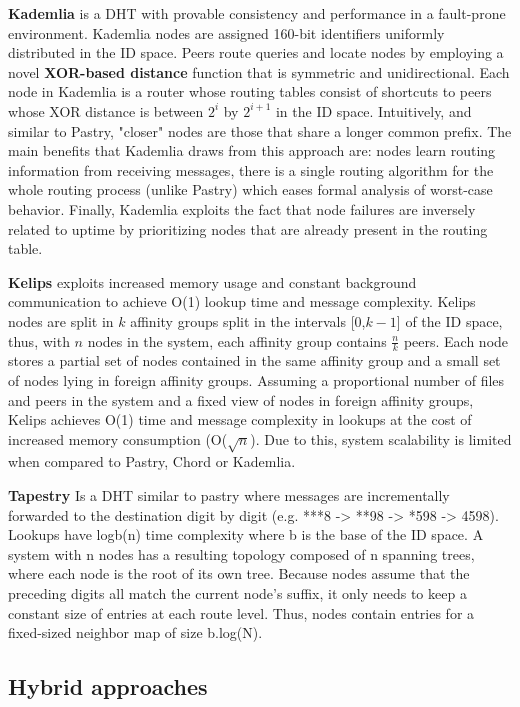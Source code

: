 \textbf{Kademlia} \cite{10.1007/3-540-45748-8_5} is a DHT with provable consistency and performance in a fault-prone environment. Kademlia nodes are assigned 160-bit identifiers uniformly distributed in the ID space. Peers route queries and locate nodes by employing a novel \textbf{XOR-based distance} function that is symmetric and unidirectional. Each node in Kademlia is a router whose routing tables consist of shortcuts to peers whose XOR distance is between \(2^{i}\) by \(2^{i + 1}\) in the ID space. Intuitively, and similar to Pastry, "closer" nodes are those that share a longer common prefix. The main benefits that Kademlia draws from this approach are: nodes learn routing information from receiving messages, there is a single routing algorithm for the whole routing process (unlike Pastry) which eases formal analysis of worst-case behavior. Finally, Kademlia exploits the fact that node failures are inversely related to uptime by prioritizing nodes that are already present in the routing table.

\textbf{Kelips} \cite{gupta2003kelips} exploits increased memory usage and constant background communication to achieve O(1) lookup time and message complexity. Kelips nodes are split in $k$ affinity groups split in the intervals [0,$k-1$] of the ID space, thus, with $n$ nodes in the system, each affinity group contains $\frac{n}{k}$ peers. Each node stores a partial set of nodes contained in the same affinity group and a small set of nodes lying in foreign affinity groups. Assuming a proportional number of files and peers in the system and a fixed view of nodes in foreign affinity groups, Kelips achieves O(1) time and message complexity in lookups at the cost of increased memory consumption (O($\sqrt{n}$). Due to this, system scalability is limited when compared to Pastry, Chord or Kademlia. 

\textbf{Tapestry} \cite{tapestry} Is a DHT similar to pastry where messages are incrementally forwarded to the destination digit by digit (e.g. ***8 -> **98 -> *598 -> 4598). Lookups have logb(n) time complexity where b is the base of the ID space. A system with n nodes has a resulting topology composed of n spanning trees, where each node is the root of its own tree. Because nodes assume that the preceding digits all match the current node's suffix, it only needs to keep a constant size of entries at each route level. Thus, nodes contain entries for a fixed-sized neighbor map of size b.log(N). 

\subsection{Hybrid approaches}


